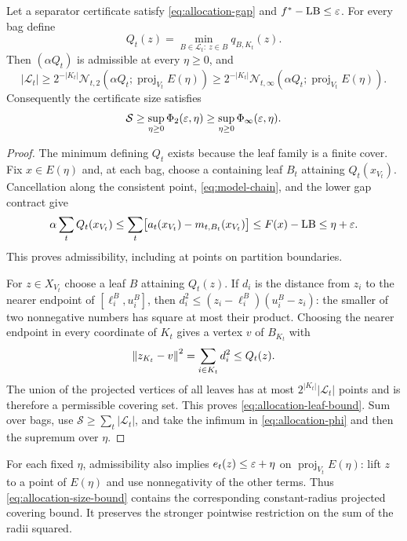 \begin{theorem}
\label{thm:allocation-pointwise}
Let a separator certificate satisfy \eqref{eq:allocation-gap} and
$f^*-\mathrm{LB}\le\varepsilon$. For every bag define
\[
 Q_t(z)=\min_{B\in\mathcal L_t:\ z\in B}q_{B,K_t}(z).
\]
Then $(\alpha Q_t)$ is admissible at every $\eta\ge0$, and
\begin{equation}\label{eq:allocation-leaf-bound}
 |\mathcal L_t|\ge2^{-|K_t|}
 \mathcal N_{t,2}(\alpha Q_t;\operatorname{proj}_{V_t}E(\eta))
 \ge2^{-|K_t|}
 \mathcal N_{t,\infty}(\alpha Q_t;\operatorname{proj}_{V_t}E(\eta)).
\end{equation}
Consequently the certificate size satisfies
\begin{equation}\label{eq:allocation-size-bound}
 \mathcal S\ge\sup_{\eta\ge0}\Phi_2(\varepsilon,\eta)
 \ge\sup_{\eta\ge0}\Phi_\infty(\varepsilon,\eta).
\end{equation}
\end{theorem}
\begin{proof}
The minimum defining $Q_t$ exists because the leaf family is a finite
cover. Fix $x\in E(\eta)$ and, at each bag, choose a containing leaf
$B_t$ attaining $Q_t(x_{V_t})$. Cancellation along the consistent point,
\eqref{eq:model-chain}, and the lower gap contract give
\[
 \alpha\sum_tQ_t(x_{V_t})
 \le\sum_t\bigl[a_t(x_{V_t})-m_{t,B_t}(x_{V_t})\bigr]
 \le F(x)-\mathrm{LB}\le\eta+\varepsilon.
\]
This proves admissibility, including at points on partition boundaries.

For $z\in X_{V_t}$ choose a leaf $B$ attaining $Q_t(z)$. If $d_i$ is
the distance from $z_i$ to the nearer endpoint of $[\ell_i^B,u_i^B]$,
then
$d_i^2\le(z_i-\ell_i^B)(u_i^B-z_i)$: the smaller of two nonnegative
numbers has square at most their product. Choosing the nearer endpoint
in every coordinate of $K_t$ gives a vertex $v$ of $B_{K_t}$ with
\[
 \left\lVert z_{K_t}-v\right\rVert^2=\sum_{i\in K_t}d_i^2\le Q_t(z).
\]
The union of the projected vertices of all leaves has at most
$2^{|K_t|}|\mathcal L_t|$ points and is therefore a permissible covering
set. This proves \eqref{eq:allocation-leaf-bound}. Sum over bags, use
$\mathcal S\ge\sum_t|\mathcal L_t|$, and take the infimum in
\eqref{eq:allocation-phi} and then the supremum over $\eta$.
\end{proof}

For each fixed $\eta$, admissibility also implies
$e_t(z)\le\varepsilon+\eta$ on $\operatorname{proj}_{V_t}E(\eta)$: lift $z$ to
a point of $E(\eta)$ and use nonnegativity of the other terms.
Thus \eqref{eq:allocation-size-bound} contains the corresponding
constant-radius projected covering bound. It preserves the stronger
pointwise restriction on the sum of the radii squared.

